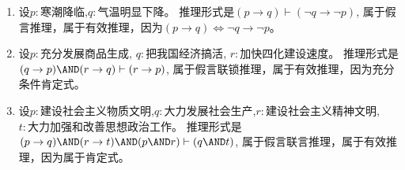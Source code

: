 \documentclass{ctexart}
\begin{document}
\begin{solution}
  \begin{enumerate}
    \item 设\(p:\text{寒潮降临}\),\(q:\text{气温明显下降}\)。
      推理形式是\((p \to q ) \vdash (\neg q \to \neg p)\), 属于假言推理，属于有效推理，因为\((p \to q) \iff \neg q \to \neg p\)。
    \item 设\(p:\text{充分发展商品生成}\), \(q:\text{把我国经济搞活}\), \(r:\text{加快四化建设速度}\)。
      推理形式是\((q \to p) \AND (r \to q) \vdash (r \to  p)\), 属于假言联锁推理，属于有效推理，因为充分条件肯定式。
    \item 设\(p:\text{建设社会主义物质文明}\),\(q:\text{大力发展社会生产}\),\(r:\text{建设社会主义精神文明}\), \(t:\text{大力加强和改善思想政治工作}\)。
      推理形式是\((p \to q) \AND (r \to t) \AND(p \AND r) \vdash (q \AND t)\), 属于假言联言推理，属于有效推理，因为属于肯定式。
  \end{enumerate}

\end{solution}
\end{document}
